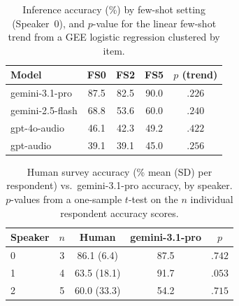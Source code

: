 \begin{table}[t]
\centering
\small
\begin{tabular}{lcccc}
\toprule
\textbf{Model} & \textbf{FS0} & \textbf{FS2} & \textbf{FS5} & \textbf{$p$ (trend)} \\
\midrule
gemini-3.1-pro   & 87.5 & 82.5 & 90.0 & $.226$ \\
gemini-2.5-flash & 68.8 & 53.6 & 60.0 & $.240$ \\
gpt-4o-audio     & 46.1 & 42.3 & 49.2 & $.422$ \\
gpt-audio        & 39.1 & 39.1 & 45.0 & $.256$ \\
\bottomrule
\end{tabular}
\caption{Inference accuracy (\%) by few-shot setting (Speaker~0), and
$p$-value for the linear few-shot trend from a GEE logistic regression
clustered by item.}
\label{tab:fewshot}
\end{table}


\begin{table}[t]
\centering
\small
\begin{tabular}{lcccc}
\toprule
\textbf{Speaker} & \textbf{$n$} & \textbf{Human} & \textbf{gemini-3.1-pro} & \textbf{$p$} \\
\midrule
0 & 3 & 86.1 (6.4)  & 87.5 & $.742$ \\
1 & 4 & 63.5 (18.1) & 91.7 & $.053$ \\
2 & 5 & 60.0 (33.3) & 54.2 & $.715$ \\
\bottomrule
\end{tabular}
\caption{Human survey accuracy (\% mean (SD) per respondent) vs.\
gemini-3.1-pro accuracy, by speaker. $p$-values from a one-sample $t$-test
on the $n$ individual respondent accuracy scores.}
\label{tab:survey-ttest}
\end{table}


%
